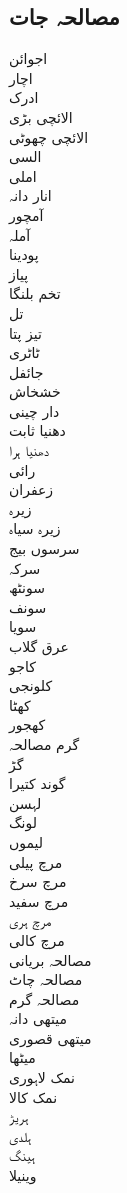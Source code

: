 \documentclass[a4paper,11pt]{article}
\begin{document}
\begin{multicols}{6}
\section*{مصالحہ جات}
اجوائن‬ \\
اچار‬ \\
ادرک‬ \\
الائچی‬ بڑی \\
الائچی‬ چھوٹی \\
السی‬ \\
املی‬ \\
انار دانہ‬ \\
آمچور‬ \\
آملہ‬ \\
پودینا‬ \\
پیاز‬ \\
تخم بلنگا‬ \\
تل‬ \\
تیز پتا \\
ٹاٹری‬ \\
جائفل‬ \\
خشخاش‬ \\
دار چینی \\
دھنیا‬ ثابت \\
دھنیا‬ ہرا \\
رائی‬ \\
زعفران‬ \\
زیرہ \\
زیرہ‬ سیاہ \\
سرسوں بیج‬ \\
سرکہ‬ \\
سونٹھ‬ \\
سونف \\
سویا‬ \\
عرق گلاب‬ \\
كاجو‬ \\
کلونجی‬ \\
کھٹا \\
کھجور‬ \\
گرم مصالحہ‬ \\
گڑ‬ \\
گوند کتیرا‬ \\
لہسن‬ \\
لونگ‬ \\
لیموں‬ \\
مرچ‬ پیلی  \\
مرچ‬ سرخ  \\
مرچ‬ سفید  \\
مرچ‬ ہری \\
مرچ کالی \\
مصالحہ بریانی \\
مصالحہ چاٹ \\
مصالحہ گرم \\
میتھی دانہ‬ \\
میتھی قصوری  \\
میٹھا \\
نمک لاہوری‬ \\
نمک‬ كالا \\
ہریڑ \\
ہلدی‬ \\
ہینگ \\
وینیلا‬

\end{multicols}
\end{document}
